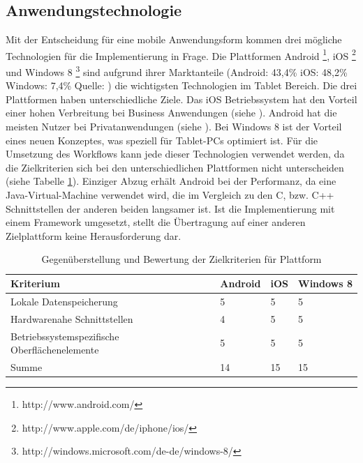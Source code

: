 \subsection{Anwendungstechnologie}
Mit der Entscheidung für eine mobile Anwendungsform kommen drei mögliche Technologien für die Implementierung in Frage. Die Plattformen Android \footnote{http://www.android.com/}, iOS \footnote{http://www.apple.com/de/iphone/ios/} und Windows 8 \footnote{http://windows.microsoft.com/de-de/windows-8/} sind aufgrund ihrer Marktanteile (Android: 43,4\% iOS: 48,2\% Windows: 7,4\% Quelle: \cite{bib:marktanteilBS} ) die wichtigsten Technologien im Tablet Bereich. Die drei Plattformen haben unterschiedliche Ziele. Das iOS Betriebssystem hat den Vorteil einer hohen Verbreitung bei Business Anwendungen (siehe \cite[S.5]{bib:mobileMarketing2}). Android hat die meisten Nutzer bei Privatanwendungen (siehe \cite{bib:marktanteilMBS}). Bei Windows 8 ist der Vorteil eines neuen Konzeptes, was speziell für Tablet-PCs optimiert ist. Für die Umsetzung des Workflows kann jede dieser Technologien verwendet werden, da die Zielkriterien sich bei den unterschiedlichen Plattformen nicht unterscheiden (siehe Tabelle \ref{decisionTechnologie}). Einziger Abzug erhält Android bei der Performanz, da eine Java-Virtual-Machine verwendet wird, die im Vergleich zu den C, bzw. C++ Schnittstellen der anderen beiden langsamer ist. Ist die Implementierung mit einem Framework umgesetzt, stellt die Übertragung auf einer anderen Zielplattform keine Herausforderung dar. \par 
\begin{table}
\begin{tabular}[H]{| p{5.4cm} | p{2.5cm} | p{2.5cm} | p{2.5cm} |}
\toprule[2pt] \rowcolor{dunkelgrau}
\hline
  Kriterium & Android & iOS & Windows 8 \\
  \hline
  Lokale Datenspeicherung & 5 & 5 & 5
   \\
  \hline
  Hardwarenahe Schnittstellen &4  &5  & 5  \\
  \hline
    Betriebssystemspezifische Oberflächenelemente & 5 & 5 & 5 \\
  \hline
    Summe & 14 & 15 & 15 \\
  \hline
\bottomrule[2pt]
\end{tabular}
\caption{Gegenüberstellung und Bewertung der Zielkriterien für Plattform}
\label{decisionTechnologie}
\end{table}

